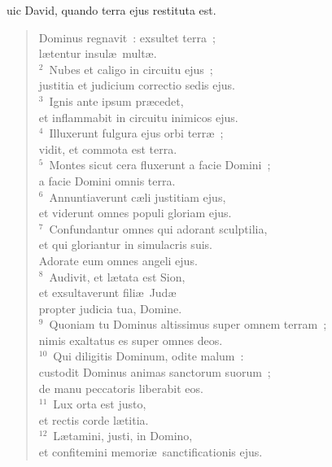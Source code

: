 \bchapter
{}uic David, quando terra ejus restituta est. \begin{flushleft}\begin{verse}\vspace{6pt}Dominus regnavit~: exsultet terra~;\\ l\ae tentur insul\ae\ mult\ae .\\
${}^{2}$~Nubes et caligo in circuitu ejus~;\\ justitia et judicium correctio sedis ejus.\\
${}^{3}$~Ignis ante ipsum pr\ae cedet,\\ et inflammabit in circuitu inimicos ejus.\\
${}^{4}$~Illuxerunt fulgura ejus orbi terr\ae~;\\ vidit, et commota est terra.\\
${}^{5}$~Montes sicut cera fluxerunt a facie Domini~;\\ a facie Domini omnis terra.\\
${}^{6}$~Annuntiaverunt c\ae li justitiam ejus,\\ et viderunt omnes populi gloriam ejus.\\
${}^{7}$~Confundantur omnes qui adorant sculptilia,\\ et qui gloriantur in simulacris suis.\\ Adorate eum omnes angeli ejus.\\
${}^{8}$~Audivit, et l\ae tata est Sion,\\ et exsultaverunt fili\ae\ Jud\ae \\ propter judicia tua, Domine.\\
${}^{9}$~Quoniam tu Dominus altissimus super omnem terram~;\\ nimis exaltatus es super omnes deos.\\
${}^{10}$~Qui diligitis Dominum, odite malum~:\\ custodit Dominus animas sanctorum suorum~;\\ de manu peccatoris liberabit eos.\\
${}^{11}$~Lux orta est justo,\\ et rectis corde l\ae titia.\\
${}^{12}$~L\ae tamini, justi, in Domino,\\ et confitemini memori\ae\ sanctificationis ejus.\end{verse}\end{flushleft}



